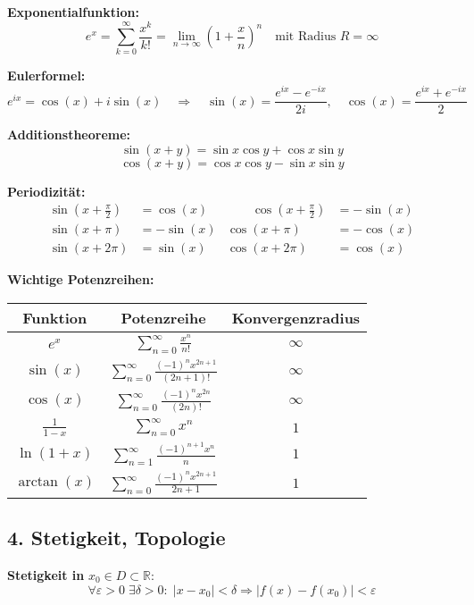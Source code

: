 \vspace{0.5em}

\textbf{Exponentialfunktion:}
\[
e^x = \sum_{k=0}^\infty \frac{x^k}{k!} = \lim_{n \to \infty} \left(1 + \frac{x}{n}\right)^n
\quad \text{mit Radius } R = \infty
\]

\textbf{Eulerformel:}  
\[
e^{ix} = \cos(x) + i \sin(x)
\quad\Rightarrow\quad
\sin(x) = \frac{e^{ix} - e^{-ix}}{2i},\quad
\cos(x) = \frac{e^{ix} + e^{-ix}}{2}
\]

\textbf{Additionstheoreme:}  
\[
\sin(x + y) = \sin x \cos y + \cos x \sin y
\]
\[
\cos(x + y) = \cos x \cos y - \sin x \sin y
\]

\textbf{Periodizität:}
\[
\begin{aligned}
\sin(x + \tfrac{\pi}{2}) &= \cos(x) & \qquad \cos(x + \tfrac{\pi}{2}) &= -\sin(x) \\
\sin(x + \pi) &= -\sin(x) & \cos(x + \pi) &= -\cos(x) \\
\sin(x + 2\pi) &= \sin(x) & \cos(x + 2\pi) &= \cos(x)
\end{aligned}
\]

\textbf{Wichtige Potenzreihen:}
\begin{tabular}{|c|c|c|}
\hline
Funktion & Potenzreihe & Konvergenzradius \\
\hline
\( e^x \) & \( \sum\limits_{n=0}^\infty \frac{x^n}{n!} \) & \( \infty \) \\
\hline
\( \sin(x) \) & \( \sum\limits_{n=0}^\infty \frac{(-1)^n x^{2n+1}}{(2n+1)!} \) & \( \infty \) \\
\hline
\( \cos(x) \) & \( \sum\limits_{n=0}^\infty \frac{(-1)^n x^{2n}}{(2n)!} \) & \( \infty \) \\
\hline
\( \frac{1}{1 - x} \) & \( \sum\limits_{n=0}^\infty x^n \) & \( 1 \) \\
\hline
\( \ln(1 + x) \) & \( \sum\limits_{n=1}^\infty \frac{(-1)^{n+1} x^n}{n} \) & \( 1 \) \\
\hline
\( \arctan(x) \) & \( \sum\limits_{n=0}^\infty \frac{(-1)^n x^{2n+1}}{2n+1} \) & \( 1 \) \\
\hline
\end{tabular}



\subsection{4. Stetigkeit, Topologie}
\textbf{Stetigkeit in } $x_0 \in D \subset \mathbb{R}$:  
\[
\forall \varepsilon > 0\; \exists \delta > 0:\; |x - x_0| < \delta \Rightarrow |f(x) - f(x_0)| < \varepsilon
\]

